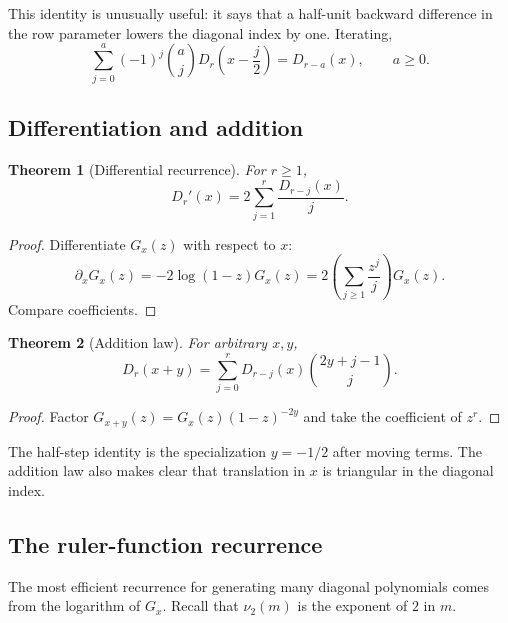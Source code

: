 \documentclass[11pt,oneside]{article}
\numberwithin{equation}{section}
\newtheorem{theorem}{Theorem}[section]
\theoremstyle{definition}
\theoremstyle{remark}
\newcommand{\nuTwo}{\nu_2}
\newcommand{\Diag}{D}
\begin{document}
This identity is unusually useful: it says that a half-unit backward
difference in the row parameter lowers the diagonal index by one.  Iterating,
\begin{equation}
 \sum_{j=0}^{a}(-1)^j\binom aj
 \Diag_r\!\left(x-\frac j2\right)
 =\Diag_{r-a}(x),
 \qquad a\ge0.
 \label{eq:iterated-half-step}
\end{equation}

\subsection{Differentiation and addition}

\begin{theorem}[Differential recurrence]
For \(r\ge1\),
\begin{equation}
 \boxed{
 \Diag_r'(x)=2\sum_{j=1}^{r}\frac{\Diag_{r-j}(x)}{j}.}
 \label{eq:differential-recurrence}
\end{equation}
\end{theorem}

\begin{proof}
Differentiate \(G_x(z)\) with respect to \(x\):
\[
 \partial_xG_x(z)=-2\log(1-z)G_x(z)
 =2\left(\sum_{j\ge1}\frac{z^j}{j}\right)G_x(z).
\]
Compare coefficients.
\end{proof}

\begin{theorem}[Addition law]
For arbitrary \(x,y\),
\begin{equation}
 \boxed{
 \Diag_r(x+y)=\sum_{j=0}^{r}
 \Diag_{r-j}(x)\binom{2y+j-1}{j}.}
 \label{eq:addition-law}
\end{equation}
\end{theorem}

\begin{proof}
Factor \(G_{x+y}(z)=G_x(z)(1-z)^{-2y}\) and take the coefficient of \(z^r\).
\end{proof}

The half-step identity is the specialization \(y=-1/2\) after moving terms.
The addition law also makes clear that translation in \(x\) is triangular in
the diagonal index.

\subsection{The ruler-function recurrence}

The most efficient recurrence for generating many diagonal polynomials comes
from the logarithm of \(G_x\).  Recall that \(\nuTwo(m)\) is the exponent of
\(2\) in \(m\).
\end{document}
